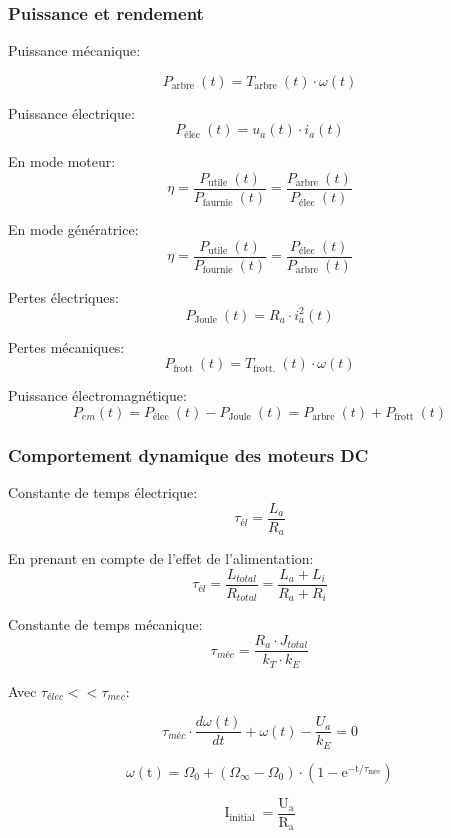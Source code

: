 \documentclass[10pt]{article} %
\begin{document}
\begin{multicols}{3}
\begin{flushleft}
			\subsubsection*{Puissance et rendement}
				
				Puissance mécanique:
				
				\[P_{\text {arbre }}(t)=T_{\text {arbre }}(t) \cdot \omega(t)\]
				
				Puissance électrique:
				\[P_{\text {élec }}(t)=u_{a}(t) \cdot i_{a}(t)\]
				
				En mode moteur:
				\[\eta=\frac{P_{\text {utile }}(t)}{P_{\text {faurnie }}(t)}=\frac{P_{\text {arbre }}(t)}{P_{\text {élec }}(t)}\]
				
				En mode génératrice:
				\[\eta=\frac{P_{\text {utile }}(t)}{P_{\text {fournie }}(t)}=\frac{P_{\text {élec }}(t)}{P_{\text {arbre }}(t)}\]
				
				Pertes électriques:
				\[P_{\text {Joule }}(t)=R_{a} \cdot i_{a}^{2}(t)\]
				
				Pertes mécaniques:
				\[P_{\text {frott }}(t)=T_{\text {frott. }}(t) \cdot \omega(t)\]
				
				Puissance électromagnétique:
				\[P_{e m}(t)=P_{\text {élec }}(t)-P_{\text {Joule }}(t)=P_{\text {arbre }}(t)+P_{\text {frott }}(t)\]
			
			\subsubsection*{Comportement dynamique des moteurs DC}
				
				Constante de temps électrique:
				\[\tau_{é l}=\frac{L_{a}}{R_{a}}\]
				
				En prenant en compte de l'effet de l'alimentation:
				\[\tau_{é l}=\frac{L_{t o t a l}}{R_{t o t a l}}=\frac{L_{a}+L_{i}}{R_{a}+R_{i}}\]
				
				Constante de temps mécanique:
				\[\tau_{m é c}=\frac{R_{a} \cdot J_{t o t a l}}{k_{T} \cdot k_{E}}\]
				
				Avec $\tau_{élec} << \tau_{mec}$:
				
				\[\tau_{m é c} \cdot \frac{d \omega(t)}{d t}+\omega(t)-\frac{U_{a}}{k_{E}}=0\]
				
				\[\omega(\mathrm{t})=\Omega_{0}+\left(\Omega_{\infty}-\Omega_{0}\right) \cdot\left(1-\mathrm{e}^{-\mathrm{t} / \tau_{\mathrm{méc}}}\right)\]
				
				\[\mathrm{I}_{\text {initial }}=\frac{\mathrm{U}_{\mathrm{a}}}{\mathrm{R}_{\mathrm{a}}}\]
				

\end{flushleft}
\end{multicols}
\end{document}
